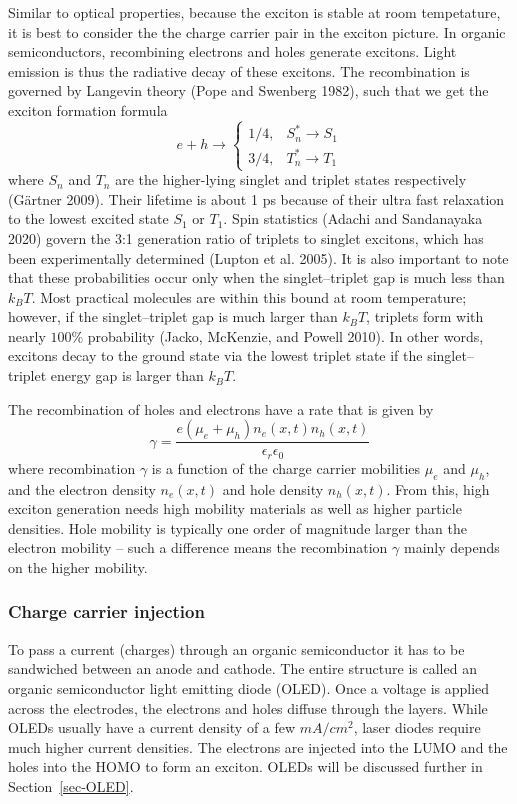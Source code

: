 \documentclass[
  letterpaper,
  DIV=11,
  numbers=noendperiod,
  oneside]{scrreprt}
\begin{document}
Similar to optical properties, because the exciton is stable at room
tempetature, it is best to consider the the charge carrier pair in the
exciton picture. In organic semiconductors, recombining electrons and
holes generate excitons. Light emission is thus the radiative decay of
these excitons. The recombination is governed by Langevin theory (Pope
and Swenberg 1982), such that we get the exciton formation formula
\[e + h \rightarrow
\begin{cases}
    1/4,& S_n^*\rightarrow S_1\\
    3/4,& T_n^*\rightarrow T_1
\end{cases}\] where \(S_n\) and \(T_n\) are the higher-lying singlet and
triplet states respectively (Gärtner 2009). Their lifetime is about 1 ps
because of their ultra fast relaxation to the lowest excited state
\(S_1\) or \(T_1\). Spin statistics (Adachi and Sandanayaka 2020) govern
the 3:1 generation ratio of triplets to singlet excitons, which has been
experimentally determined (Lupton et al. 2005). It is also important to
note that these probabilities occur only when the singlet--triplet gap
is much less than \(k_BT\). Most practical molecules are within this
bound at room temperature; however, if the singlet--triplet gap is much
larger than \(k_BT\), triplets form with nearly \(100\%\) probability
(Jacko, McKenzie, and Powell 2010). In other words, excitons decay to
the ground state via the lowest triplet state if the singlet--triplet
energy gap is larger than \(k_BT\).

The recombination of holes and electrons have a rate that is given by
\[\gamma = \frac{e(\mu_e+\mu_h)n_e(x,t)n_h(x,t)}{\epsilon_r\epsilon_0}\]
where recombination \(\gamma\) is a function of the charge carrier
mobilities \(\mu_e\) and \(\mu_h\), and the electron density
\(n_e(x,t)\) and hole density \(n_h(x,t)\). From this, high exciton
generation needs high mobility materials as well as higher particle
densities. Hole mobility is typically one order of magnitude larger than
the electron mobility -- such a difference means the recombination
\(\gamma\) mainly depends on the higher mobility.

\hypertarget{charge-carrier-injection}{%
\subsubsection{Charge carrier
injection}\label{charge-carrier-injection}}

To pass a current (charges) through an organic semiconductor it has to
be sandwiched between an anode and cathode. The entire structure is
called an organic semiconductor light emitting diode (OLED). Once a
voltage is applied across the electrodes, the electrons and holes
diffuse through the layers. While OLEDs usually have a current density
of a few \(mA/cm^2\), laser diodes require much higher current
densities. The electrons are injected into the LUMO and the holes into
the HOMO to form an exciton. OLEDs will be discussed further in
Section~\ref{sec-OLED}.
\end{document}
